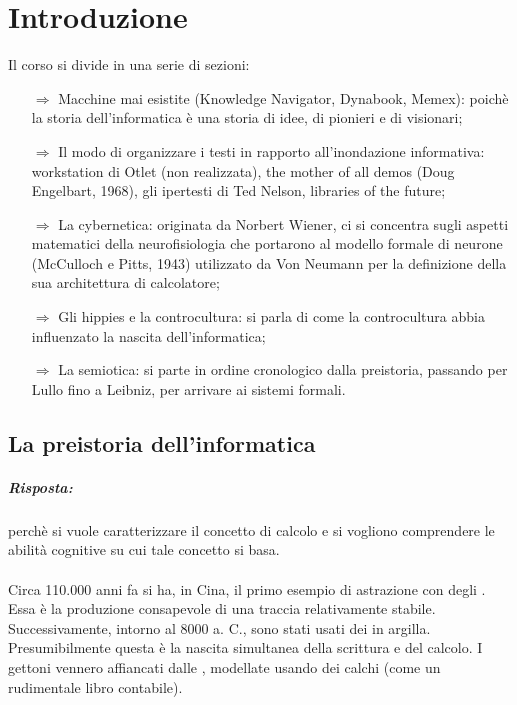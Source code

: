 \chapter{Introduzione}

Il corso si divide in una serie di sezioni:
\begin{itemize}
    \item [$\Rightarrow$] Macchine mai esistite (Knowledge
    Navigator, Dynabook, Memex): poichè la storia dell'informatica
    è una storia di idee, di pionieri e di visionari;
    \item [$\Rightarrow$] Il modo di organizzare i testi in rapporto all'inondazione 
    informativa: workstation di Otlet (non realizzata), the mother of all
    demos (Doug Engelbart, 1968), gli ipertesti di Ted Nelson, libraries
    of the future;
    \item [$\Rightarrow$] La cybernetica: originata da Norbert Wiener, ci si concentra sugli
    aspetti matematici della neurofisiologia che portarono al modello formale di
    neurone (McCulloch e Pitts, 1943) utilizzato da Von Neumann per la
    definizione della sua architettura di calcolatore;
    \item [$\Rightarrow$] Gli hippies e la controcultura: si parla di come la controcultura 
    abbia influenzato la nascita dell'informatica;
    \item [$\Rightarrow$] La semiotica: si parte in ordine cronologico dalla preistoria, passando per Lullo fino
    a Leibniz, per arrivare ai sistemi formali.
\end{itemize}

\section{La preistoria dell'informatica}


\paragraph{Risposta:} perchè si vuole caratterizzare il
concetto di calcolo e si vogliono comprendere le abilità cognitive
su cui tale concetto si basa.

\subsubsection{}

Circa 110.000 anni fa si ha, in Cina, il primo esempio di astrazione con degli . Essa è la produzione consapevole di una traccia relativamente stabile. Successivamente, intorno al 8000 a. C., sono stati usati dei  in argilla. Presumibilmente questa è la nascita simultanea della scrittura e del calcolo. I gettoni vennero affiancati dalle , modellate usando dei calchi (come un rudimentale libro contabile).

